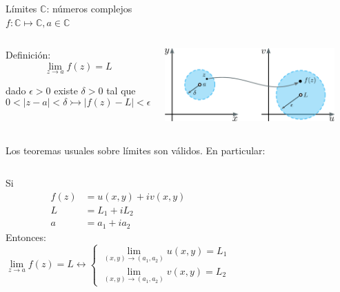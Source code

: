 \documentclass[9pt, aspectratio=169]{beamer}
\begin{document}
\begin{frame}{Límites}
 $\mathbb{C}$: números complejos \\
 $f: \mathbb{C} \mapsto \mathbb{C}, a \in \mathbb{C}$
 
 \begin{columns}[c]
 \begin{alertblock}{Definición:}
  \[ \lim_{z \rightarrow a} f(z) = L \]
  
  dado $\epsilon >0$ existe $\delta > 0$ tal que
  \[ 0 < |z - a| < \delta \rightarrowtail |f(z) - L| < \epsilon \]
 \end{alertblock} \pause
  \includegraphics[width=0.9\textwidth]{figs/fig-03}
 \end{columns} \pause
 
 \noindent Los teoremas usuales sobre límites \alert{son válidos}. En particular: \vspace{0.5em}
 
 \begin{columns}[t]
  Si
  \begin{align*}
   f(z) &= u(x, y) + i v(x, y) \\
   L &= L_1 + i L_2 \\
   a &= a_1 + i a_2
  \end{align*}
  Entonces:
  \[ \lim_{z \rightarrow a} f(z) = L \longleftrightarrow
  \begin{cases}
    \lim_{(x,y) \rightarrow (a_1, a_2)} u(x, y) = L_1  \\
    \lim_{(x,y) \rightarrow (a_1, a_2)} v(x, y) = L_2
  \end{cases}
  \]
 \end{columns}
\end{frame}
\end{document}

